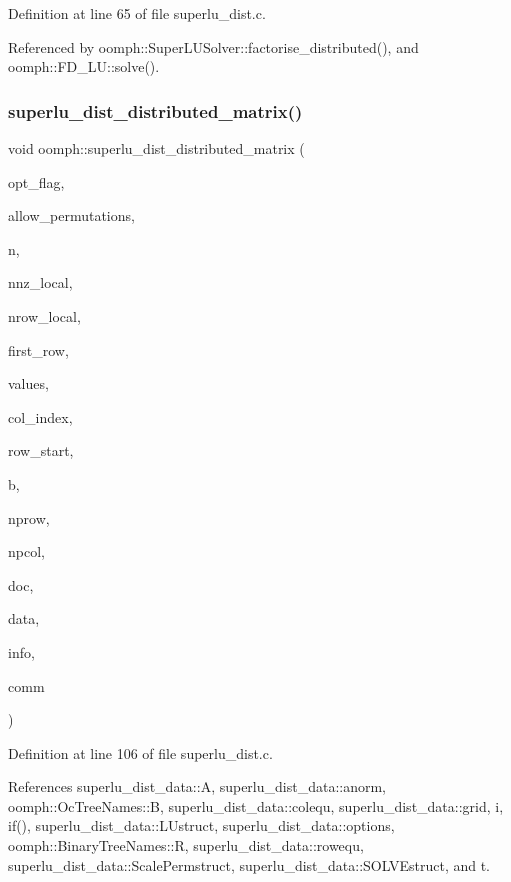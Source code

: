 Definition at line 65 of file superlu\+\_\+dist.\+c.



Referenced by oomph\+::\+Super\+L\+U\+Solver\+::factorise\+\_\+distributed(), and oomph\+::\+F\+D\+\_\+\+L\+U\+::solve().

\mbox{\label{namespaceoomph_afda4e6a29a247cb24203d0c93047a05e}} 
\subsubsection{\texorpdfstring{superlu\+\_\+dist\+\_\+distributed\+\_\+matrix()}{superlu\_dist\_distributed\_matrix()}}
{\footnotesize\ttfamily void oomph\+::superlu\+\_\+dist\+\_\+distributed\+\_\+matrix (\begin{DoxyParamCaption}\item[{int}]{opt\+\_\+flag,  }\item[{int}]{allow\+\_\+permutations,  }\item[{int}]{n,  }\item[{int}]{nnz\+\_\+local,  }\item[{int}]{nrow\+\_\+local,  }\item[{int}]{first\+\_\+row,  }\item[{double $\ast$}]{values,  }\item[{int $\ast$}]{col\+\_\+index,  }\item[{int $\ast$}]{row\+\_\+start,  }\item[{double $\ast$}]{b,  }\item[{int}]{nprow,  }\item[{int}]{npcol,  }\item[{int}]{doc,  }\item[{void $\ast$$\ast$}]{data,  }\item[{int $\ast$}]{info,  }\item[{M\+P\+I\+\_\+\+Comm}]{comm }\end{DoxyParamCaption})}



Definition at line 106 of file superlu\+\_\+dist.\+c.



References superlu\+\_\+dist\+\_\+data\+::A, superlu\+\_\+dist\+\_\+data\+::anorm, oomph\+::\+Oc\+Tree\+Names\+::B, superlu\+\_\+dist\+\_\+data\+::colequ, superlu\+\_\+dist\+\_\+data\+::grid, i, if(), superlu\+\_\+dist\+\_\+data\+::\+L\+Ustruct, superlu\+\_\+dist\+\_\+data\+::options, oomph\+::\+Binary\+Tree\+Names\+::R, superlu\+\_\+dist\+\_\+data\+::rowequ, superlu\+\_\+dist\+\_\+data\+::\+Scale\+Permstruct, superlu\+\_\+dist\+\_\+data\+::\+S\+O\+L\+V\+Estruct, and t.



